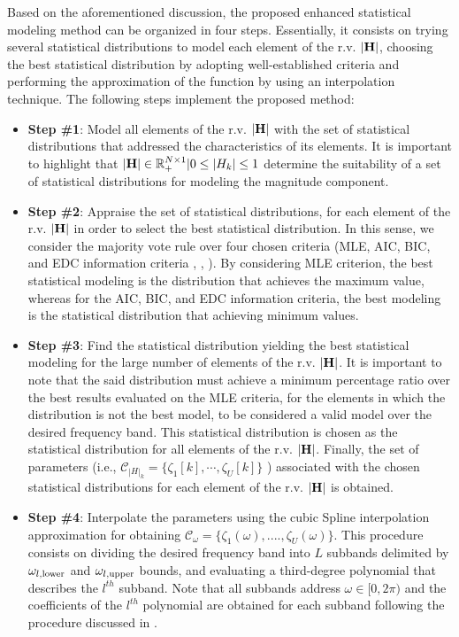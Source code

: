 \documentclass[journal]{IEEEtran}
\begin{document}
Based on the aforementioned discussion, the proposed enhanced statistical modeling method can be organized in four steps. Essentially, it consists on trying several statistical distributions to model each element of the \ac{r.v.} $\bf |H|$, choosing the best statistical distribution by adopting well-established criteria and performing the approximation of the function by using an interpolation technique. The following steps implement the proposed method:
\begin{itemize}
	\item \textbf{Step \#1}: Model all elements of the \ac{r.v.} $\bf |H|$ with the set of statistical distributions that addressed the characteristics of its elements. It is important to highlight that ${\bf |H|} \in \mathbb{R}_{+}^{N\times 1}|0 \leq {|H_k|} \leq 1$ determine the suitability of a set of statistical distributions for modeling the magnitude component.
	\item \textbf{Step \#2}: Appraise the set of statistical distributions, for each element of the \ac{r.v.} $\bf |H|$ in order to select the best statistical distribution. In this sense, we consider the majority vote rule \cite{vote} over four chosen criteria (\ac{MLE}, \ac{AIC}, \ac{BIC}, and \ac{EDC} information criteria \cite{Dorea:Sim}, \cite{Cabral:Multi}, \cite{Andrei:Meas}). By considering \ac{MLE} criterion, the best statistical modeling is the distribution that achieves the maximum value, whereas for the \ac{AIC}, \ac{BIC}, and \ac{EDC} information criteria, the best modeling is the statistical distribution that achieving minimum values.
	\item \textbf{Step \#3}: Find the statistical distribution yielding the best statistical modeling for the large number of elements of the \ac{r.v.} $\bf |H|$. It is important to note that the said distribution must achieve a minimum percentage ratio over the best results evaluated on the \ac{MLE} criteria, for the elements in which the distribution is not the best model, to be considered a valid model over the desired frequency band. This statistical distribution is chosen as the statistical distribution for all elements of the \ac{r.v.} $\bf |H|$. Finally, the set of parameters (i.e., $\mathcal{C}_{|H|_k} = \{ \zeta_{1}[k], \cdots, \zeta_{U}[k] \}$ ) associated with the chosen statistical distributions for each element of the \ac{r.v.} $\bf |H|$ is obtained.
    \item \textbf{Step \#4}: Interpolate the parameters using the cubic Spline interpolation approximation for obtaining $\mathcal{C}_{\omega} = \{ \zeta_{1}(\omega), ...., \zeta_{U} (\omega)\}$. This procedure consists on dividing the desired frequency band into $L$ subbands delimited by $\omega_{l,\textnormal{lower}}$ and $\omega_{l,\textnormal{upper}}$ bounds, and evaluating a third-degree polynomial that describes the $l^{th}$ subband. Note that all subbands address $\omega \in [0,2\pi)$ and the coefficients of the $l^{th}$ polynomial are obtained for each subband following the procedure discussed in \cite{ENA,CS1}.      
\end{itemize}
\end{document}

